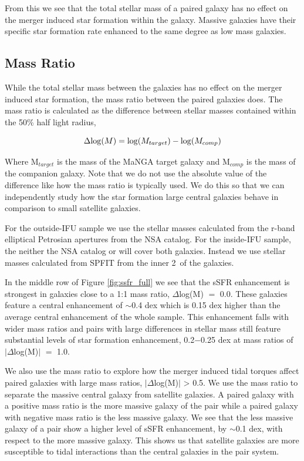 \documentclass[iop,revtex4,twocolumn,apj,numberedappendix,appendixfloats]{emulateapj}
\begin{document}
From this we see that the total stellar mass of a paired galaxy has no effect on the merger induced star formation within the galaxy. Massive galaxies have their specific star formation rate enhanced to the same degree as low mass galaxies. 

\subsection{Mass Ratio}
While the total stellar mass between the galaxies has no effect on the merger induced star formation, the mass ratio between the paired galaxies does. The mass ratio is calculated as the difference between stellar masses contained within the 50\% half light radius, 

\begin{equation}
\Delta {\rm log}(M) = {\rm log}(M_{target}) - {\rm log}(M_{comp}) 
\end{equation}

Where M$_{target}$ is the mass of the MaNGA target galaxy and M$_{comp}$ is the mass of the companion galaxy. Note that we do not use the absolute value of the difference like how the mass ratio is typically used. We do this so that we can independently study how the star formation large central galaxies behave in comparison to small satellite galaxies.

For the outside-IFU sample we use the stellar masses calculated from the r-band elliptical Petrosian apertures from the NSA catalog. For the inside-IFU sample, the neither the NSA catalog or \citet{Mendel:2014} will cover both galaxies. Instead we use stellar masses calculated from {\sc SPFIT} from the inner 2\arcsec\ of the galaxies. 

In the middle row of Figure \ref{fig:ssfr_full} we see that the sSFR enhancement is strongest in galaxies close to a 1:1 mass ratio, $\Delta$log(M) $=$ 0.0. These galaxies feature a central enhancement of $\sim$0.4 dex which is 0.15 dex higher than the average central enhancement of the whole sample. This enhancement falls with wider mass ratios and pairs with large differences in stellar mass still feature substantial levels of star formation enhancement, 0.2$-$0.25 dex at mass ratios of $|\Delta$log(M)$|$ $=$ 1.0.

We also use the mass ratio to explore how the merger induced tidal torques affect paired galaxies with large mass ratios, $|\Delta$log(M)$|$ > 0.5. We use the mass ratio to separate the massive central galaxy from satellite galaxies. A paired galaxy with a positive mass ratio is the more massive galaxy of the pair while a paired galaxy with negative mass ratio is the less massive galaxy. We see that the less massive galaxy of a pair show a higher level of sSFR enhancement, by $\sim$0.1 dex, with respect to the more massive galaxy. This shows us that satellite galaxies are more susceptible to tidal interactions than the central galaxies in the pair system. 
\end{document}
